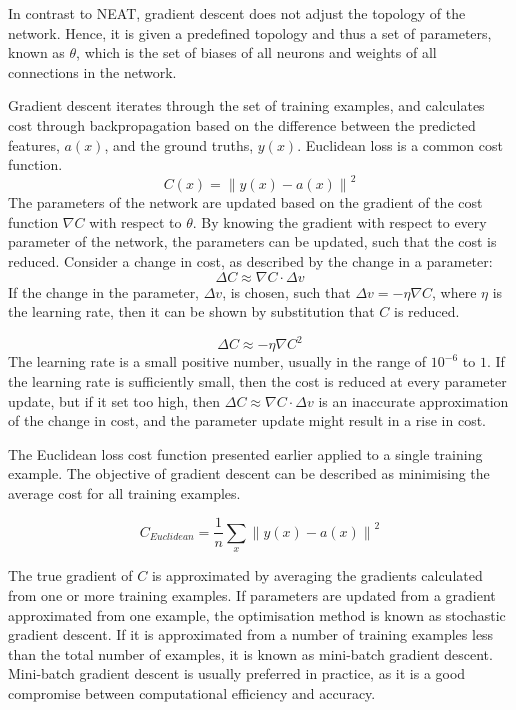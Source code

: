 In contrast to NEAT, gradient descent does not adjust the topology of the network. Hence, it is given a predefined topology and thus a set of parameters, known as $\theta$, which is the set of biases of all neurons and weights of all connections in the network. 

Gradient descent iterates through the set of training examples, and calculates cost through backpropagation based on the difference between the predicted features, $a(x)$, and the ground truths, $y(x)$. Euclidean loss is a common cost function.
$$C(x) = {\lVert y(x) - a(x) \rVert}^2$$
The parameters of the network are updated based on the gradient of the cost function $\nabla C$ with respect to $\theta$. By knowing the gradient with respect to every parameter of the network, the parameters can be updated, such that the cost is reduced. Consider a change in cost, as described by the change in a parameter:
$$\Delta C \approx \nabla C \cdot \Delta v $$
If the change in the parameter, $\Delta v$, is chosen, such that $\Delta v = - \eta \nabla C$, where $\eta$ is the learning rate, then it can be shown by substitution that $C$ is reduced.

$$\Delta C \approx - \eta {\nabla C}^2 $$
The learning rate is a small positive number, usually in the range of $10^{-6}$ to $1$. If the learning rate is sufficiently small, then the cost is reduced at every parameter update, but if it set too high, then $\Delta C \approx \nabla C \cdot \Delta v $ is an inaccurate approximation of the change in cost, and the parameter update might result in a rise in cost. \newline

The Euclidean loss cost function presented earlier applied to a single training example. The objective of gradient descent can be described as minimising the average cost for all training examples.

$$C_{Euclidean} = \frac{1}{n} \sum_{x} {\lVert y(x) - a(x) \rVert}^2$$

The true gradient of $C$ is approximated by averaging the gradients calculated from one or more training examples. If parameters are updated from a gradient approximated from one example, the optimisation method is known as stochastic gradient descent. If it is approximated from a number of training examples less than the total number of examples, it is known as mini-batch gradient descent. Mini-batch gradient descent is usually preferred in practice, as it is a good compromise between computational efficiency and accuracy.

